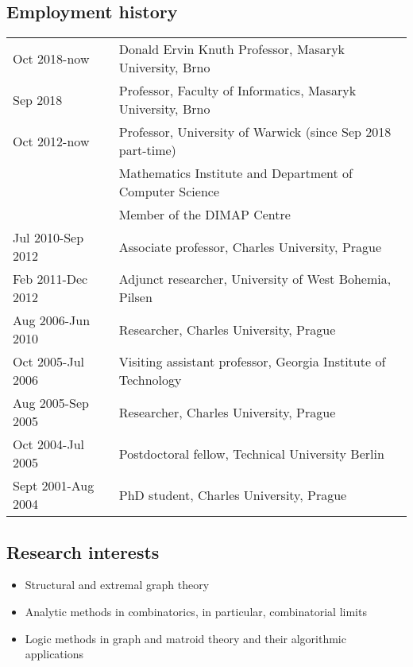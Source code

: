 \documentclass[11pt]{article}
\begin{document}
\subsection*{Employment history}
\begin{tabular}{ll}
Oct 2018-now & Donald Ervin Knuth Professor, Masaryk University, Brno\\
Sep 2018 & Professor, Faculty of Informatics, Masaryk University, Brno\\
Oct 2012-now & Professor, University of Warwick (since Sep 2018 part-time)\\
& Mathematics Institute and Department of Computer Science\\
& Member of the DIMAP Centre\\
Jul 2010-Sep 2012 & Associate professor, Charles University, Prague\\
Feb 2011-Dec 2012 & Adjunct researcher, University of West Bohemia, Pilsen\\
Aug 2006-Jun 2010 & Researcher, Charles University, Prague\\
Oct 2005-Jul 2006 & Visiting assistant professor, Georgia Institute of Technology\\
Aug 2005-Sep 2005 & Researcher, Charles University, Prague\\
Oct 2004-Jul 2005 & Postdoctoral fellow, Technical University Berlin\\
Sept 2001-Aug 2004 & PhD student, Charles University, Prague 
\end{tabular}

\subsection*{Research interests}
\begin{itemize}
\setlength\itemsep{-1mm}
\item Structural and extremal graph theory
\item Analytic methods in combinatorics, in particular, combinatorial limits
\item Logic methods in graph and matroid theory and their algorithmic applications
\end{itemize}

\newpage
{}
\end{document}
